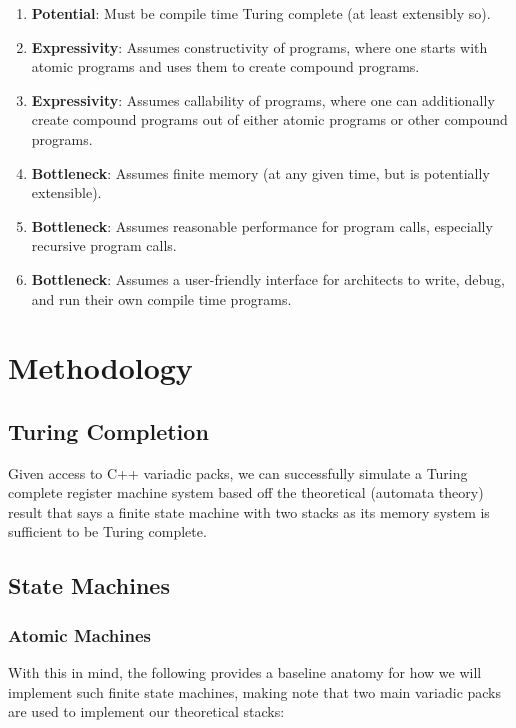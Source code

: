\documentclass[twoside]{article}
\newcommand{\strong}[1]{{\bfseries #1}}
\begin{document}
\begin{enumerate}
\item \strong{Potential}: Must be compile time Turing complete (at least extensibly so).
\item \strong{Expressivity}: Assumes constructivity of programs, where one starts with atomic programs
	and uses them to create compound programs.
\item \strong{Expressivity}: Assumes callability of programs, where one can additionally create compound
	programs out of either atomic programs or other compound programs.
\item \strong{Bottleneck}: Assumes finite memory (at any given time, but is potentially extensible).
\item \strong{Bottleneck}: Assumes reasonable performance for program calls, especially recursive program calls.
\item \strong{Bottleneck}: Assumes a user-friendly interface for architects to write, debug, and run their own compile time programs.
\end{enumerate}

\section*{Methodology}

\subsection*{Turing Completion}

Given access to C++ variadic packs, we can successfully simulate a Turing complete register machine system based off the
theoretical (automata theory) result that says a finite state machine with two stacks as its memory system is sufficient
to be Turing complete.

\subsection*{State Machines}

\subsubsection*{Atomic Machines}

With this in mind, the following provides a baseline anatomy for how we will implement such finite
state machines, making note that two main variadic packs are used to implement our theoretical stacks:
\end{document}
